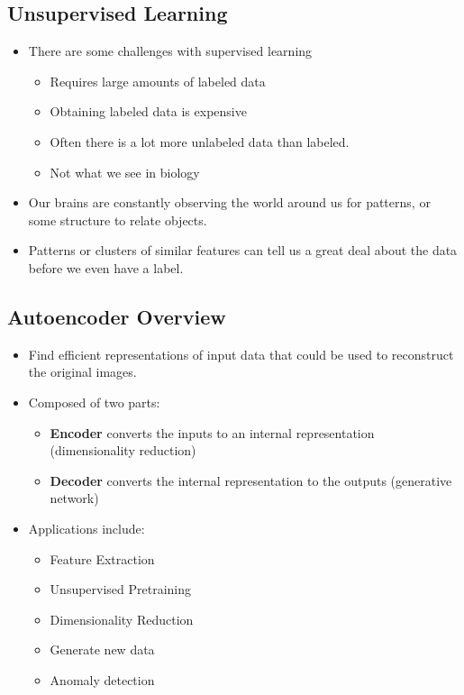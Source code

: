 \documentclass[11pt]{article}
\begin{document}
\subsection{Unsupervised Learning}
\begin{itemize}
\item There are some challenges with supervised learning
\begin{itemize}
\item Requires large amounts of labeled data
\item Obtaining labeled data is expensive
\item Often there is a lot more unlabeled data than labeled.
\item Not what we see in biology
\end{itemize}
\item Our brains are constantly observing the world around us for patterns, or some structure to relate objects.
\item Patterns or clusters of similar features can tell us a great deal about the data before we even have a label.
\end{itemize}

\subsection{Autoencoder Overview}
\begin{itemize}
\item Find efficient representations of input data that could be used to reconstruct the original images.
\item Composed of two parts:
\begin{itemize}
\item \textbf{Encoder} converts the inputs to an internal
representation (dimensionality reduction)
\item \textbf{Decoder} converts the internal representation to the outputs (generative network)
\end{itemize}
\item Applications include:
\begin{itemize}
\item Feature Extraction
\item Unsupervised Pretraining
\item Dimensionality Reduction
\item Generate new data
\item Anomaly detection
\end{itemize}
\end{itemize}
\end{document}
